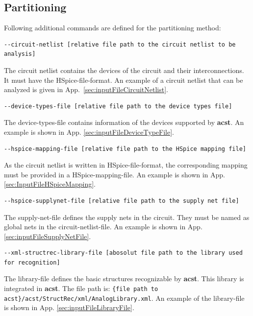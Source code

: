 \subsection{Partitioning}\label{sec:commandsPartitioning}
Following additional commands are defined for the partitioning method:
\\

\begin{lstlisting}[basicstyle=\ttfamily\scriptsize,backgroundcolor={\color{gray!30}}, escapechar=? ]
--circuit-netlist [relative file path to the circuit netlist to be analysis]
\end{lstlisting}
The circuit netlist contains the devices of the circuit and their interconnections. It must have the HSpice-file-format. An example of a circuit netlist  that can be analyzed is given in App.~\ref{sec:inputFileCircuitNetlist}.
\\

\begin{lstlisting}[basicstyle=\ttfamily\scriptsize,backgroundcolor={\color{gray!30}}, escapechar=? ]
--device-types-file [relative file path to the device types file]
\end{lstlisting}
The device-types-file contains information of the devices supported by {\bf acst}. An example is shown in App. \ref{sec:inputFileDeviceTypeFile}.
\\

\begin{lstlisting}[basicstyle=\ttfamily\scriptsize,backgroundcolor={\color{gray!30}}, escapechar=? ]
--hspice-mapping-file [relative file path to the HSpice mapping file]
\end{lstlisting}
As the circuit netlist is written in HSpice-file-format, the corresponding mapping must be provided in a HSpice-mapping-file. An example is shown in App. \ref{sec:InputFileHSpiceMapping}.
\\

\begin{lstlisting}[basicstyle=\ttfamily\scriptsize,backgroundcolor={\color{gray!30}}, escapechar=? ]
--hspice-supplynet-file [relative file path to the supply net file]
\end{lstlisting}
The supply-net-file defines the supply nets in the circuit. They must be named as global nets in the circuit-netlist-file. An example is shown in App. \ref{sec:inputFileSupplyNetFile}.
\\

\begin{lstlisting}[basicstyle=\ttfamily\scriptsize,backgroundcolor={\color{gray!30}}, escapechar=? ]
--xml-structrec-library-file [abosolut file path to the library used for recognition] 
\end{lstlisting}
The library-file defines the basic structures recognizable by {\bf acst}. This library is integrated in {\bf acst}. The file path is: {\tt \{file path to acst\}/acst/StructRec/xml/AnalogLibrary.xml}. An example of the library-file is shown in App. \ref{sec:inputFileLibraryFile}.
\\

